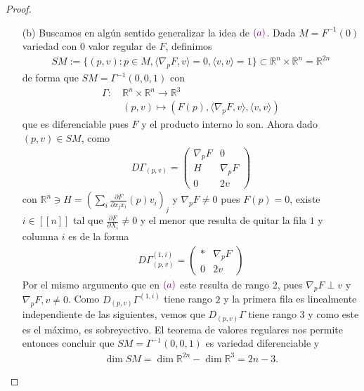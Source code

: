 \documentclass[11pt]{article}
\newcommand{\R}{\mathbb{R}}
\newcommand{\dpart}[2]{\frac{\partial#1}{\partial#2}}
\newcommand{\nat}[1]{[\![#1]\!]}
\newcommand{\ip}[2]{\langle #1 , #2 \rangle}
\newcommand{\paint}[2]{\color{#1}{#2}}
\begin{document}
\begin{proof}
\begin{itemize}
\item[(b)] Buscamos en alg\'un sentido generalizar la idea de $\paint{purple}{(a)}$. Dada $M = F^{-1}(0)$ variedad con $0$ valor regular de $F$, definimos
\begin{align*}
SM := \{(p,v) : p \in M, \ip{\nabla_pF}{v} = 0, \ip{v}{v} = 1\} \subset \R^n \times \R^n = \R^{2n}
\end{align*}
de forma que $SM = \Gamma^{-1}(0,0,1)$ con
\begin{align*}
\Gamma : \ &\R^n \times \R^n \to \R^3 \\
&(p,v) \longmapsto (F(p),\ip{\nabla_pF}{v},\ip{v}{v})
\end{align*}
que es diferenciable pues $F$ y el producto interno lo son. Ahora dado $(p,v) \in SM$, como
\begin{align*}
D\Gamma_{(p,v)} = \begin{pmatrix}
\nabla_pF & 0\\
H & \nabla_pF\\
0 & 2v
\end{pmatrix}
\end{align*}
con $\R^n \ni H = \left(\sum_i\dpart{F}{x_jx_i}(p)v_i\right)_j$ y $\nabla_pF \neq 0$ pues $F(p) = 0$, existe $i \in \nat{n}$ tal que $\dpart{F}{X_i} \neq 0$ y el menor que resulta de quitar la fila $1$ y columna $i$ es de la forma
\begin{align*}
D\Gamma_{(p,v)}^{(1,i)} = \begin{pmatrix}
* & \nabla_pF \\
0 & 2v
\end{pmatrix}
\end{align*}
Por el mismo argumento que en $\paint{purple}{(a)}$ este resulta de rango $2$, pues $\nabla_pF \perp v$ y $\nabla_pF,v \neq 0$. Como $D_{(p,v)}\Gamma^{(1,i)}$ tiene rango $2$ y la primera fila es linealmente independiente de las siguientes, vemos que $D_{(p,v)}\Gamma$ tiene rango $3$ y como este es el m\'aximo, es sobreyectivo. El teorema de valores regulares nos permite entonces concluir que $SM = \Gamma^{-1}(0,0,1)$ es variedad diferenciable y
\begin{align*}
\dim SM = \dim \R^{2n} - \dim \R^3 = 2n-3.
\end{align*}
\end{itemize}
\end{proof}
\end{document}
